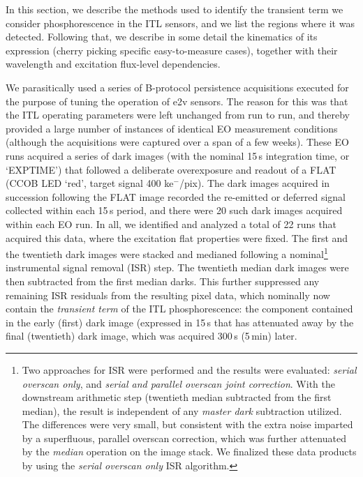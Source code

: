 In this section, we describe the methods used to identify the transient term we consider phosphorescence in the ITL sensors, and we list the regions where it was detected. Following that, we describe in some detail the kinematics of its expression (cherry picking specific easy-to-measure cases), together with their wavelength and excitation flux-level dependencies.

We parasitically used a series of B-protocol persistence acquisitions executed for the purpose of tuning the operation of e2v sensors. The reason for this was that the ITL operating parameters were left unchanged from run to run, and thereby provided a large number of instances of identical EO measurement conditions (although the acquisitions were captured over a span of a few weeks). These EO runs acquired a series of dark images (with the nominal 15\,s integration time, or `EXPTIME') that followed a deliberate overexposure and readout of a FLAT (CCOB LED `red', target signal 400 ke$^-$/pix). The dark images acquired in succession following the FLAT image recorded the re-emitted or deferred signal collected within each 15\,s period, and there were 20 such dark images acquired within each EO run. In all, we identified and analyzed a total of 22 runs that acquired this data, where the excitation flat properties were fixed. The first and the twentieth dark images were stacked and medianed following a nominal\footnote{Two approaches for ISR were performed and the results were evaluated: {\it serial overscan only}, and {\it serial and parallel overscan joint correction}. With the downstream arithmetic step (twentieth median subtracted from the first median), the result is independent of any {\it master dark} subtraction utilized. The differences were very small, but consistent with the extra noise imparted by a superfluous, parallel overscan correction, which was further attenuated by the {\it median} operation on the image stack. We finalized these data products by using the {\it serial overscan only} ISR algorithm.} instrumental signal removal (ISR) step. The twentieth median dark images were then subtracted from the first median darks. This further suppressed any remaining ISR residuals from the resulting pixel data, which nominally now contain the {\it transient term} of the ITL phosphorescence: the component contained in the early (first) dark image (expressed in 15\,s that has attenuated away by the final (twentieth) dark image, which was acquired 300\,s (5\,min) later.

\clearpage

